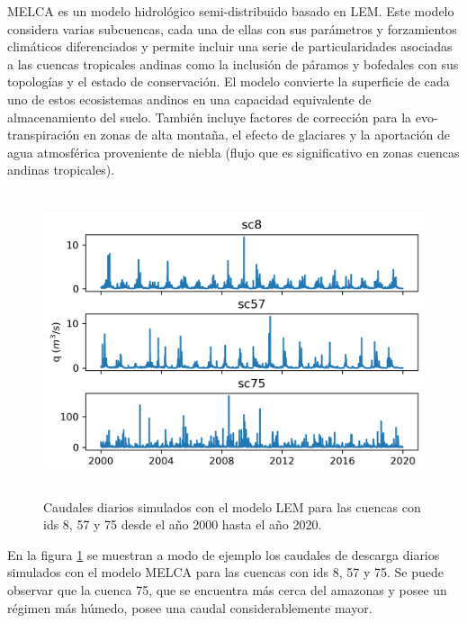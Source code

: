 MELCA es un modelo hidrológico semi-distribuido basado en LEM. 
Este modelo considera varias subcuencas, cada una de ellas con sus parámetros y forzamientos climáticos diferenciados
y permite incluir una serie de particularidades asociadas a las cuencas tropicales andinas como la inclusión de páramos 
y bofedales con sus topologías y el estado de conservación. El modelo convierte la superficie de cada uno de estos 
ecosistemas andinos en una capacidad equivalente de almacenamiento del suelo. 
También  incluye factores de corrección para  la evo-transpiración en zonas de alta montaña, el efecto de glaciares 
y la aportación de agua atmosférica proveniente de niebla (flujo que es significativo en zonas cuencas andinas tropicales). 


\begin{figure}[h!]
    \begin{center}
      \includegraphics[height=3.5in]{Figures/caudales.png}
      \caption{ Caudales diarios simulados con el modelo LEM para las cuencas con ids 8, 57 y 75 desde el año 2000 hasta
      el año 2020. }
      \label{caudales}
    \end{center}
  \end{figure}

En la figura \ref{caudales} se muestran a modo de ejemplo los caudales de descarga diarios simulados con el modelo MELCA 
para las cuencas con ids 8, 57 y 75. Se puede observar que la cuenca 75, que se encuentra más cerca del amazonas y posee 
un régimen más húmedo, posee una caudal considerablemente mayor.

